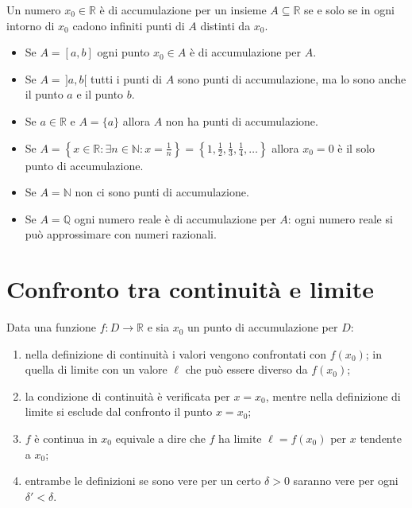 \documentclass[11pt,a4paper]{article}
\begin{document}
\begin{proposizione}
Un numero $x_0 \in \mathbb{R}$ è di accumulazione per un insieme $A \subseteq \mathbb{R}$ se e solo se in ogni intorno di $x_0$ cadono infiniti punti di $A$ distinti da $x_0$.
\end{proposizione}

\begin{esempio}
\begin{itemize}
    \item Se $A = [a, b]$ ogni punto $x_0 \in A$ è di accumulazione per $A$.
    \item Se $A = \,]a, b[$ tutti i punti di $A$ sono punti di accumulazione, ma lo sono anche il punto $a$ e il punto $b$.
    \item Se $a \in \mathbb{R}$ e $A = \{a\}$ allora $A$ non ha punti di accumulazione.
    \item Se $A = \left\{ x \in \mathbb{R} : \exists n \in \mathbb{N} : x = \tfrac{1}{n} \right\} = \left\{1, \tfrac{1}{2}, \tfrac{1}{3}, \tfrac{1}{4}, \dots \right\}$ allora $x_0 = 0$ è il solo punto di accumulazione.
    \item Se $A = \mathbb{N}$ non ci sono punti di accumulazione.
    \item Se $A = \mathbb{Q}$ ogni numero reale è di accumulazione per $A$: ogni numero reale si può approssimare con numeri razionali.
\end{itemize}
\end{esempio}

\section{Confronto tra continuità e limite}

Data una funzione $f : D \to \mathbb{R}$ e sia $x_0$ un punto di accumulazione per $D$:
\begin{enumerate}
    \item nella definizione di continuità i valori vengono confrontati con $f(x_0)$; in quella di limite con un valore $\ell$ che può essere diverso da $f(x_0)$;
    \item la condizione di continuità è verificata per $x = x_0$, mentre nella definizione di limite si esclude dal confronto il punto $x = x_0$;
    \item $f$ è continua in $x_0$ equivale a dire che $f$ ha limite $\ell = f(x_0)$ per $x$ tendente a $x_0$;
    \item entrambe le definizioni se sono vere per un certo $\delta > 0$ saranno vere per ogni $\delta' < \delta$.
\end{enumerate}
\end{document}
